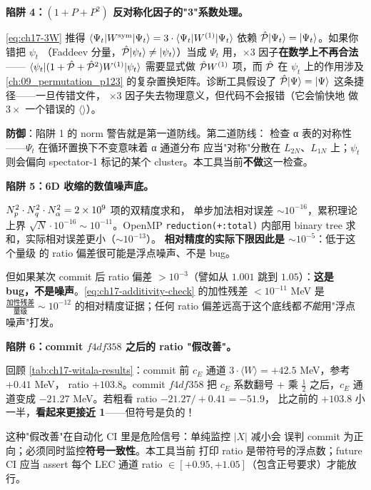 \begin{pitfallbox}[label={box:ch17-pitfall-1plusP}]
\textbf{陷阱 4：\((1+P+P^2)\) 反对称化因子的"3"系数处理。}

\cref{eq:ch17-3W} 推得 \(\langle\Psi_t|W^{\rm sym}|\Psi_t\rangle = 3\cdot\langle\Psi_t|W^{(1)}|\Psi_t\rangle\)
依赖 \(\hat{\mathcal{P}}|\Psi_t\rangle = |\Psi_t\rangle\)。如果你错把 \(\psi_t\)
（Faddeev 分量，\(\hat{\mathcal{P}}|\psi_t\rangle \neq |\psi_t\rangle\)）当成
\(\Psi_t\) 用，\(\times 3\) 因子\textbf{在数学上不再合法}——
\(\langle\psi_t|(1+\hat{\mathcal{P}}+\hat{\mathcal{P}}^2)W^{(1)}|\psi_t\rangle\) 需要显式做
\(\hat{\mathcal{P}} W^{(1)}\) 项，而 \(\hat{\mathcal{P}}\) 在 \(\psi_t\) 上的作用涉及
\cref{ch:09_permutation_p123} 的复杂置换矩阵。诊断工具假设了
\(\hat{\mathcal{P}}|\Psi\rangle = |\Psi\rangle\) 这条捷径——一旦传错文件，
\(\times 3\) 因子失去物理意义，但代码不会报错（它会愉快地
做 \(3\times\) 一个错误的 \(\langle\rangle\)）。

\textbf{防御}：陷阱 1 的 norm 警告就是第一道防线。第二道防线：
检查 α 表的对称性——\(\Psi_t\) 在循环置换下不变意味着 α 通道分布
应当"对称"分散在 \(L_{2N}\)、\(L_{1N}\) 上；\(\psi_t\) 则会偏向
spectator-1 标记的某个 cluster。本工具当前\textbf{不做}这一检查。
\end{pitfallbox}

\begin{pitfallbox}[label={box:ch17-pitfall-noise}]
\textbf{陷阱 5：6D 收缩的数值噪声底。}

\(N_p^2 \cdot N_q^2 \cdot N_\alpha^2 = 2 \times 10^9\) 项的双精度求和，
单步加法相对误差 \(\sim 10^{-16}\)，累积理论上界 \(\sqrt{N}\cdot 10^{-16}
\sim 10^{-11}\)。OpenMP \texttt{reduction(+:total)} 内部用
binary tree 求和，实际相对误差更小（\(\sim 10^{-13}\)）。
\textbf{相对精度的实际下限因此是 \(\sim 10^{-5}\)}：低于这个量级
的 ratio 偏差很可能是浮点噪声、不是 bug。

但如果某次 commit 后 ratio 偏差 \(>10^{-3}\)（譬如从 \(1.001\) 跳到
\(1.05\)）：\textbf{这是 bug，不是噪声}。\cref{eq:ch17-additivity-check}
的加性残差 \(<10^{-11}\) MeV 是 \(\frac{\text{加性残差}}{\text{量级}} \sim 10^{-12}\)
的相对精度证据；任何 ratio 偏差远高于这个底线都\emph{不能}用"浮点噪声"打发。
\end{pitfallbox}

\begin{pitfallbox}[label={box:ch17-pitfall-ce-sign-history}]
\textbf{陷阱 6：commit \(f4df358\) 之后的 ratio "假改善"。}

回顾 \cref{tab:ch17-witala-results}：commit 前 \(c_E\) 通道
\(3\cdot\langle W\rangle = +42.5\) MeV，参考 \(+0.41\) MeV，
ratio \(+103.8\)。commit \(f4df358\) 把 \(c_E\) 系数翻号 + 乘 \(\frac{1}{2}\)
之后，\(c_E\) 通道变成 \(-21.27\) MeV。若粗看 ratio \(-21.27/+0.41 = -51.9\)，
比之前的 \(+103.8\) 小一半，\textbf{看起来更接近 1}——但符号是负的！

这种"假改善"在自动化 CI 里是危险信号：单纯监控 \(|X|\) 减小会
误判 commit 为正向；必须同时监控\textbf{符号一致性}。本工具当前
打印 ratio 是带符号的浮点数；future CI 应当 assert 每个 LEC 通道
ratio \(\in [+0.95, +1.05]\)（包含正号要求）才能放行。
\end{pitfallbox}

